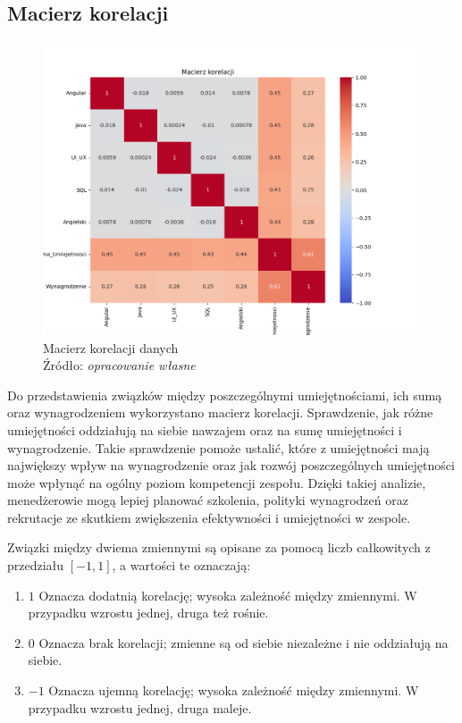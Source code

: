    \subsection{Macierz korelacji}\label{subsec:korelacja}
    \begin{figure}[H]
        \centering
        \includegraphics[width=\linewidth]{chapters/Images/korelacja.png}
        \cprotect\caption{Macierz korelacji danych\\ Źródło:\textit{ opracowanie własne}}
        \label{fig:korelacja}
    \end{figure}

    \par Do przedstawienia związków między poszczególnymi umiejętnościami, ich sumą oraz wynagrodzeniem wykorzystano macierz korelacji. Sprawdzenie, jak różne umiejętności oddziałują na siebie nawzajem oraz na sumę umiejętności i wynagrodzenie. Takie sprawdzenie pomoże ustalić, które z umiejętności mają największy wpływ na wynagrodzenie oraz jak rozwój poszczególnych umiejętności może wpłynąć na ogólny poziom kompetencji zespołu. Dzięki takiej analizie, menedżerowie mogą lepiej planować szkolenia, polityki wynagrodzeń oraz rekrutacje ze skutkiem zwiększenia efektywności i umiejętności w zespole.

    \par Związki między dwiema zmiennymi są opisane za pomocą liczb całkowitych z przedziału $[-1, 1]$, a wartości te oznaczają:
    \begin{enumerate}
        \item $1$ Oznacza dodatnią korelację; wysoka zależność między zmiennymi. W przypadku wzrostu jednej, druga też rośnie.
        \item $0$ Oznacza brak korelacji; zmienne są od siebie niezależne i nie oddziałują na siebie.
        \item $-1$ Oznacza ujemną korelację; wysoka zależność między zmiennymi. W przypadku wzrostu jednej, druga maleje.
    \end{enumerate}

